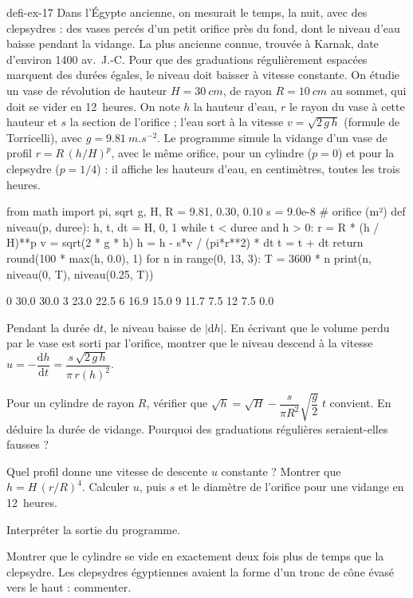 \begin{blocEdition}{defi-ex-17}
Dans l'Égypte ancienne, on mesurait le temps, la nuit, avec des clepsydres : des vases percés d'un petit orifice près du
fond, dont le niveau d'eau baisse pendant la vidange. La plus ancienne connue, trouvée à Karnak, date d'environ 1400
av.~J.-C. Pour que des graduations régulièrement espacées marquent des durées égales, le niveau doit baisser à vitesse
constante. On étudie un vase de révolution de hauteur $H=\qty{30}{cm}$, de rayon $R=\qty{10}{cm}$ au sommet, qui doit se
vider en 12~heures. On note $h$ la hauteur d'eau, $r$ le rayon du vase à cette hauteur et $s$ la section de l'orifice ;
l'eau sort à la vitesse $v=\sqrt{2\,g\,h}$ (formule de Torricelli), avec $g=\qty{9,81}{m.s^{-2}}$. Le programme simule la
vidange d'un vase de profil $r=R\,(h/H)^p$, avec le même orifice, pour un cylindre ($p=0$) et pour la clepsydre
($p=1/4$) : il affiche les hauteurs d'eau, en centimètres, toutes les trois heures.
\begin{codecote}[0.66]
\begin{pythoncol}
from math import pi, sqrt
g, H, R = 9.81, 0.30, 0.10
s = 9.0e-8                    # orifice (m²)
def niveau(p, duree):
    h, t, dt = H, 0, 1
    while t < duree and h > 0:
        r = R * (h / H)**p
        v = sqrt(2 * g * h)
        h = h - s*v / (pi*r**2) * dt
        t = t + dt
    return round(100 * max(h, 0.0), 1)
for n in range(0, 13, 3):
    T = 3600 * n
    print(n, niveau(0, T), niveau(0.25, T))
\end{pythoncol}
\cote
\begin{consolecol}
0 30.0 30.0
3 23.0 22.5
6 16.9 15.0
9 11.7 7.5
12 7.5 0.0
\end{consolecol}
\end{codecote}
\par\smallskip
\begin{questions}
\item Pendant la durée $\mathrm{d}t$, le niveau baisse de $|\mathrm{d}h|$. En écrivant que le volume perdu par le vase est sorti par
l'orifice, montrer que le niveau descend à la vitesse $u=-\dfrac{\mathrm{d}h}{\mathrm{d}t}=\dfrac{s\,\sqrt{2\,g\,h}}{\pi\,r(h)^2}$.
\item Pour un cylindre de rayon $R$, vérifier que $\sqrt{h}=\sqrt{H}-\dfrac{s}{\pi R^2}\sqrt{\dfrac{g}{2}}\;t$ convient. En déduire la durée
de vidange. Pourquoi des graduations régulières seraient-elles fausses ?
\item Quel profil donne une vitesse de descente $u$ constante ? Montrer que $h=H\,(r/R)^4$. Calculer $u$, puis $s$ et le
diamètre de l'orifice pour une vidange en 12~heures.
\item Interpréter la sortie du programme.
\item Montrer que le cylindre se vide en exactement deux fois plus de temps que la clepsydre. Les clepsydres égyptiennes
avaient la forme d'un tronc de cône évasé vers le haut : commenter.
\end{questions}
\end{blocEdition}

